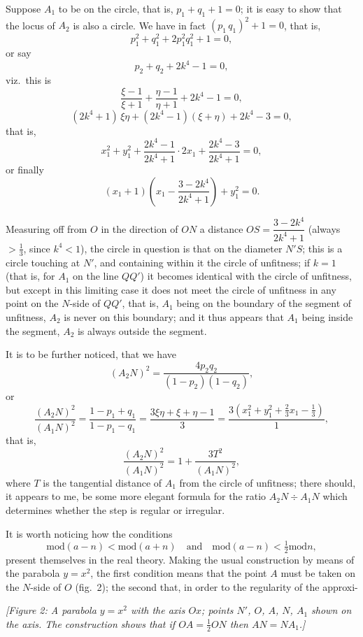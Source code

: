\documentclass[11pt]{article}
\providecommand{\modd}{\mathrm{mod}}
\begin{document}
Suppose $A_1$ to be on the circle, that is, $p_1 + q_1 + 1 = 0$; it is easy to show that
the locus of $A_2$ is also a circle. We have in fact $(p_1\,q_1)^2 + 1 = 0$, that is,
\[
   p_1^2 + q_1^2 + 2 p_1^2 q_1^2 + 1 = 0,
\]
or say
\[
   p_2 + q_2 + 2 k^4 - 1 = 0,
\]
viz.\ this is
\[
   \frac{\xi - 1}{\xi + 1} + \frac{\eta - 1}{\eta + 1} + 2 k^4 - 1 = 0,
\]
\[
   (2k^4 + 1)\,\xi\eta + (2k^4 - 1)(\xi + \eta) + 2k^4 - 3 = 0,
\]
that is,
\[
   x_1^2 + y_1^2 + \frac{2 k^4 - 1}{2 k^4 + 1}\cdot 2 x_1 + \frac{2 k^4 - 3}{2 k^4 + 1} = 0,
\]
or finally
\[
   \left(x_1 + 1\right)\left(x_1 - \frac{3 - 2 k^4}{2 k^4 + 1}\right) + y_1^2 = 0.
\]

Measuring off from $O$ in the direction of $ON$ a distance $OS = \dfrac{3 - 2 k^4}{2 k^4 + 1}$ (always $> \tfrac{1}{3}$,
since $k^4 < 1$), the circle in question is that on the diameter $N'S$; this is a circle
touching at $N'$, and containing within it the circle of unfitness; if $k = 1$ (that is, for
$A_1$ on the line $QQ'$) it becomes identical with the circle of unfitness, but except
in this limiting case it does not meet the circle of unfitness in any point on the
$N$-side of $QQ'$, that is, $A_1$ being on the boundary of the segment of unfitness, $A_2$ is
never on this boundary; and it thus appears that $A_1$ being inside the segment, $A_2$ is
always outside the segment.

It is to be further noticed, that we have
\[
   (A_2 N)^2 = \frac{4 p_2 q_2}{(1 - p_2)(1 - q_2)},
\]
or
\[
   \frac{(A_2 N)^2}{(A_1 N)^2} = \frac{1 - p_1 + q_1}{1 - p_1 - q_1} = \frac{3\xi\eta + \xi + \eta - 1}{3} = \frac{3(x_1^2 + y_1^2 + \tfrac{2}{3} x_1 - \tfrac{1}{3})}{1},
\]
that is,
\[
   \frac{(A_2 N)^2}{(A_1 N)^2} = 1 + \frac{3 T^2}{(A_1 N)^2},
\]
where $T$ is the tangential distance of $A_1$ from the circle of unfitness; there should,
it appears to me, be some more elegant formula for the ratio $A_2 N \div A_1 N$ which
determines whether the step is regular or irregular.

It is worth noticing how the conditions
\[
   \modd(a - n) < \modd(a + n)\quad\text{and}\quad \modd(a - n) < \tfrac{1}{2}\modd n,
\]
present themselves in the real theory. Making the usual construction by means of
the parabola $y = x^2$, the first condition means that the point $A$ must be taken on
the $N$-side of $O$ (fig.\ 2); the second that, in order to the regularity of the approxi-

\begin{center}
\textit{[Figure 2: A parabola $y = x^2$ with the axis $Ox$; points $N'$, $O$, $A$, $N$, $A_1$
shown on the axis. The construction shows that if $OA = \tfrac{1}{2} ON$ then $A N = N A_1$.]}
\end{center}
\end{document}
